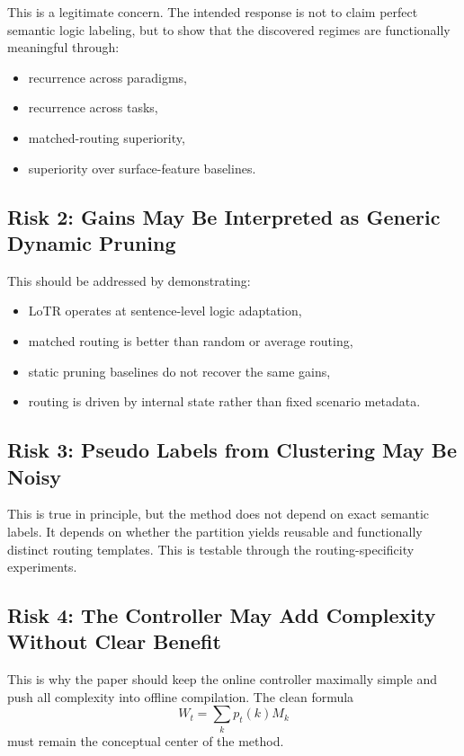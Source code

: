 \documentclass[11pt]{article}
\begin{document}
This is a legitimate concern. The intended response is not to claim perfect semantic logic labeling, but to show that the discovered regimes are functionally meaningful through:
\begin{itemize}[leftmargin=1.5em]
    \item recurrence across paradigms,
    \item recurrence across tasks,
    \item matched-routing superiority,
    \item superiority over surface-feature baselines.
\end{itemize}

\subsection{Risk 2: Gains May Be Interpreted as Generic Dynamic Pruning}

This should be addressed by demonstrating:
\begin{itemize}[leftmargin=1.5em]
    \item LoTR operates at sentence-level logic adaptation,
    \item matched routing is better than random or average routing,
    \item static pruning baselines do not recover the same gains,
    \item routing is driven by internal state rather than fixed scenario metadata.
\end{itemize}

\subsection{Risk 3: Pseudo Labels from Clustering May Be Noisy}

This is true in principle, but the method does not depend on exact semantic labels. It depends on whether the partition yields reusable and functionally distinct routing templates. This is testable through the routing-specificity experiments.

\subsection{Risk 4: The Controller May Add Complexity Without Clear Benefit}

This is why the paper should keep the online controller maximally simple and push all complexity into offline compilation. The clean formula
\[
W_t = \sum_k p_t(k)M_k
\]
must remain the conceptual center of the method.
\end{document}
